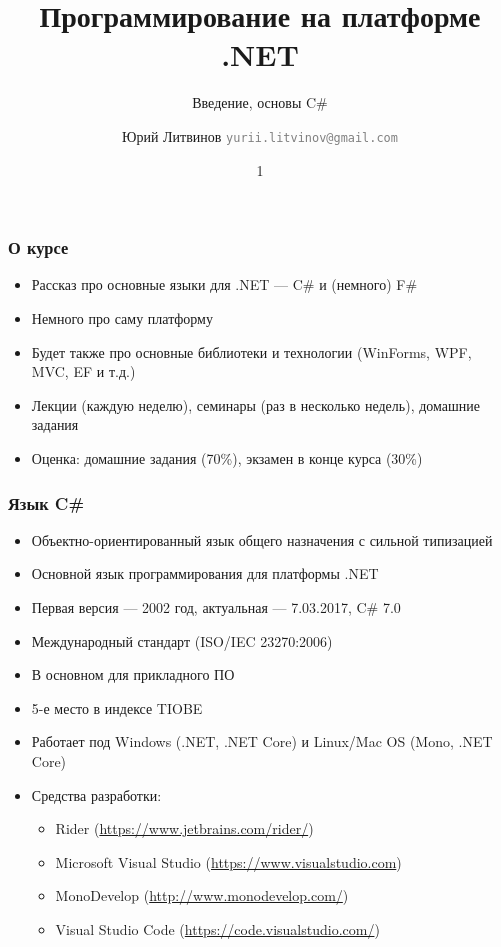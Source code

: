 \documentclass[xetex,mathserif,serif]{beamer}
\title{Программирование на платформе .NET}
\subtitle{Введение, основы C\#}
\author[Юрий Литвинов]{Юрий Литвинов \newline \textcolor{gray}{\small\texttt{yurii.litvinov@gmail.com}}}
\date{1}
\begin{document}
	
	\frame{\titlepage}
	
	\begin{frame}
		\frametitle{О курсе}
		\begin{itemize}
			\item Рассказ про основные языки для .NET --- C\# и (немного) F\#
			\item Немного про саму платформу
			\item Будет также про основные библиотеки и технологии (WinForms, WPF, MVC, EF и т.д.)
			\item Лекции (каждую неделю), семинары (раз в несколько недель), домашние задания
			\item Оценка: домашние задания (70\%), экзамен в конце курса (30\%)
		\end{itemize}
	\end{frame}

	\begin{frame}
		\frametitle{Язык C\#}
		\begin{itemize}
			\item Объектно-ориентированный язык общего назначения с сильной типизацией
			\item Основной язык программирования для платформы .NET
			\item Первая версия --- 2002 год, актуальная --- 7.03.2017, C\# 7.0
			\item Международный стандарт (ISO/IEC 23270:2006)
			\item В основном для прикладного ПО
			\item 5-е место в индексе TIOBE
			\item Работает под Windows (.NET, .NET Core) и Linux/Mac OS (Mono, .NET Core)
			\item Средства разработки:
			\begin{itemize}
				\item Rider (\url{https://www.jetbrains.com/rider/})
				\item Microsoft Visual Studio (\url{https://www.visualstudio.com})
				\item MonoDevelop (\url{http://www.monodevelop.com/})
				\item Visual Studio Code (\url{https://code.visualstudio.com/})
			\end{itemize}
		\end{itemize}
	\end{frame}
\end{document}
